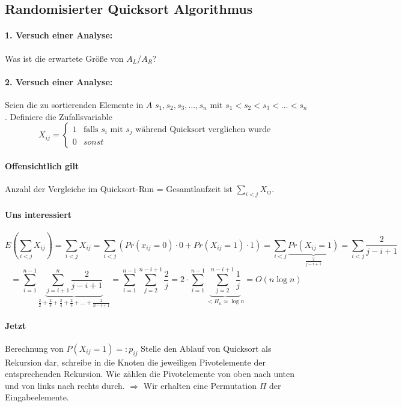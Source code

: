 \subsection{Randomisierter Quicksort Algorithmus}
\paragraph*{1. Versuch einer Analyse:} Was ist die erwartete Größe von $A_L$/$A_R$?

\paragraph*{2. Versuch einer Analyse:} Seien die zu sortierenden Elemente in $A$ $s_1,s_2,s_3,\dots,s_n$ mit $s_1<s_2<s_3<\dots<s_n$.
Definiere die Zufallsvariable
\begin{equation}
   X_{ij} =
   \begin{cases}
     1 & \text{falls } s_i \text{ mit } s_j \text{ während Quicksort verglichen wurde} \\
     0 & sonst
   \end{cases}
\end{equation}
\paragraph*{Offensichtlich gilt} Anzahl der Vergleiche im Quicksort-Run = Gesamtlaufzeit ist $\sum\limits_{i<j} X_{ij}$.

\paragraph*{Uns interessiert} $$E(\sum\limits_{i<j} X_{ij})
= \sum\limits_{i<j} X_{ij} 
= \sum\limits_{i<j}(Pr(x_{ij}=0) \cdot 0 + Pr(X_{ij}=1) \cdot 1) 
= \sum\limits_{i<j} \underbrace{Pr(X_{ij}=1)}_{\frac{2}{j-i+1}} 
= \sum\limits_{i<j} \frac{2}{j-i+1}$$
$$= \sum\limits_{i=1}^{n-1} \underbrace{\sum\limits_{j=i+1}^n \frac{2}{j-i+1}}_{\frac{2}{2}+\frac{2}{3}+\frac{2}{4}+\frac{2}{5}+\dots+\frac{2}{n-i+1}} 
= \sum\limits_{i=1}^{n-1} \sum\limits_{j=2}^{n-i+1} \frac{2}{j}
= 2 \cdot \sum\limits_{i=1}^{n-1} \underbrace{\sum\limits_{j=2}^{n-i+1} \frac{1}{j}}_{<H_n \approx \log n} 
= O(n \log n) $$

\paragraph*{Jetzt} Berechnung von $P(X_{ij}=1) =: p_{ij}$ Stelle den Ablauf von Quicksort als Rekursion dar, schreibe in die Knoten die jeweiligen Pivotelemente der entsprechenden Rekursion. Wie zählen die Pivotelemente von oben nach unten und von links nach rechts durch. $\Rightarrow$ Wir erhalten eine Permutation $\Pi$ der Eingabeelemente.

